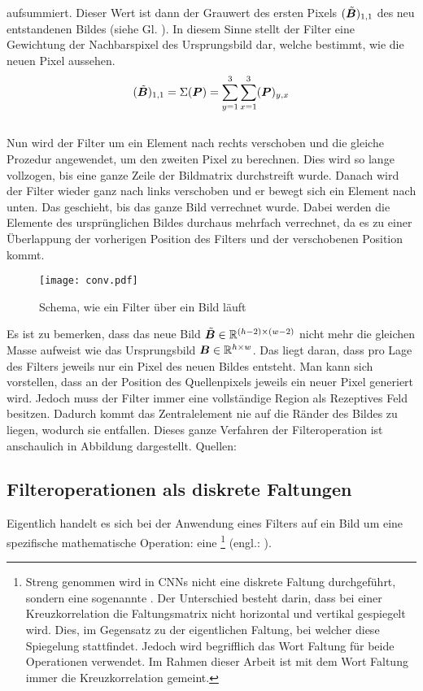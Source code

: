 aufsummiert. Dieser Wert ist dann der Grauwert des ersten Pixels
$(\tilde{\bm{B}})_{1,1}$ des neu entstandenen
Bildes (siehe Gl. ). In diesem Sinne stellt der Filter eine
Gewichtung der Nachbarspixel des Ursprungsbild dar, welche
bestimmt, wie die neuen Pixel aussehen.
\\
\begin{equation}\label{eq:filter1}
  (\tilde{\bm{B}})_{1,1} = \Sigma(\bm{P}) = \sum_{y=1}^3 \sum_{x=1}^3 (\bm{P})_{y,x}
\end{equation}
\\
Nun wird der Filter um ein Element nach rechts verschoben und die gleiche
Prozedur angewendet, um den zweiten Pixel zu berechnen. Dies
wird so lange vollzogen, bis eine ganze Zeile der Bildmatrix durchstreift wurde.
Danach wird der Filter wieder ganz nach links verschoben und er bewegt sich ein
Element nach unten. Das geschieht, bis das ganze Bild verrechnet wurde.
Dabei werden die Elemente des ursprünglichen Bildes durchaus mehrfach
verrechnet, da es zu einer Überlappung der vorherigen Position des Filters und
der verschobenen Position kommt.
\para{}
\begin{figure}[h!]
  \centering
  \texttt{[image: conv.pdf]}
  \caption{Schema, wie ein Filter über ein Bild läuft}
  \label{fig:filteroperation}
\end{figure}
\para{}
Es ist zu bemerken, dass das neue Bild $\tilde{\bm{B}} \in \mathbb{R}^{(h-2) \times (w-2)}$ nicht mehr die gleichen Masse
aufweist wie das Ursprungsbild $\bm{B} \in \mathbb{R}^{h \times w}$. Das liegt daran, dass pro
Lage des Filters jeweils nur ein Pixel des neuen Bildes entsteht. Man kann
sich vorstellen, dass an der Position des Quellenpixels jeweils ein neuer
Pixel generiert wird. Jedoch muss der Filter immer eine vollständige Region als
Rezeptives Feld besitzen. Dadurch kommt das Zentralelement nie auf die Ränder des
Bildes zu liegen, wodurch sie entfallen.
\para{}
Dieses ganze Verfahren der Filteroperation ist anschaulich in Abbildung
 dargestellt.
\para{}
Quellen: \cite{deeplearning.ai:cnn} \cite{wiki:convolution}

\subsection{Filteroperationen als diskrete Faltungen}\label{sec:filteroperation_mathematisch}
Eigentlich handelt es sich bei der Anwendung eines Filters auf ein Bild um
eine spezifische mathematische Operation: eine %
\footnote{
  Streng genommen wird in CNNs nicht eine diskrete Faltung durchgeführt, sondern
  eine sogenannte . Der Unterschied besteht darin, dass bei einer
  Kreuzkorrelation die Faltungsmatrix nicht horizontal und vertikal
  gespiegelt wird. Dies, im Gegensatz zu der eigentlichen Faltung, bei welcher
  diese Spiegelung stattfindet. Jedoch wird
  begrifflich das Wort Faltung für beide Operationen verwendet. Im Rahmen dieser
  Arbeit ist mit dem Wort Faltung immer die Kreuzkorrelation gemeint.
} (engl.: ).

